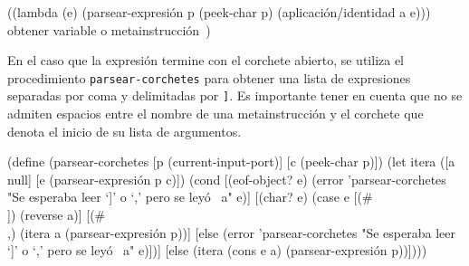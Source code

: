 \nwenddocs{}\endmoddef
((lambda (e)
   (parsear-expresión p (peek-char p) (aplicación/identidad a e)))
 \LA{}obtener variable o metainstrucción~{\nwtagstyle{}}\RA{})
\nwendcode{}\nwdocspar

En el caso que la expresión termine con el corchete abierto, se utiliza el procedimiento {\tt{}\protect{}\protect{}parsear-corchetes} para obtener una lista de expresiones separadas por coma y delimitadas por {\tt{}{}{}]}. Es importante tener en cuenta que no se admiten espacios entre el nombre de una metainstrucción y el corchete que denota el inicio de su lista de argumentos.

\nwenddocs{}\plusendmoddef
(define (parsear-corchetes [p (current-input-port)]
                           [c (peek-char p)])
  (let itera ([a null]
              [e (parsear-expresión p c)])
       (cond [(eof-object? e)
              (error 'parsear-corchetes
                     "Se esperaba leer `]' o `,' pero se leyó ~a" e)]
             [(char? e)
              (case e
                [(#\\]) (reverse a)]
                [(#\\,) (itera a (parsear-expresión p))]
                [else
                 (error 'parsear-corchetes
                        "Se esperaba leer `]' o `,' pero se leyó ~a" e)])]
             [else
              (itera (cons e a) (parsear-expresión p))])))

\eatline
{}\nwendcode{}\nwdocspar


